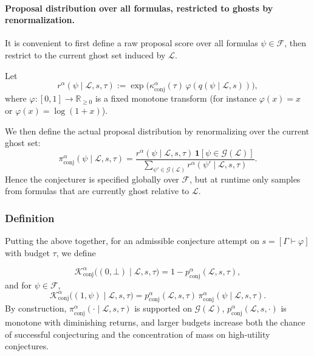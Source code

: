 \documentclass[letterpaper]{article} %
\renewcommand{\phi}{\varphi}
\newcommand{\proves}{\vdash}
\begin{document}
\paragraph{Proposal distribution over all formulas, restricted to ghosts by renormalization.}
It is convenient to first define a raw proposal score over all formulas $\psi\in\mathcal F$, then restrict to the current ghost set induced by $\mathcal L$.

Let
\[
r^\alpha(\psi\mid \mathcal L,s,\tau)
:=
\exp\!\Big(\kappa^\alpha_{\mathrm{conj}}(\tau)\,\varphi(q(\psi\mid \mathcal L,s))\Big),
\]
where $\varphi:[0,1]\to\mathbb R_{\ge0}$ is a fixed monotone transform (for instance $\varphi(x)=x$ or $\varphi(x)=\log(1+x)$).

We then define the actual proposal distribution by renormalizing over the current ghost set:
\[
\pi^\alpha_{\mathrm{conj}}(\psi\mid \mathcal L,s,\tau)
=
\frac{r^\alpha(\psi\mid \mathcal L,s,\tau)\,\mathbf 1[\psi\in\mathcal G(\mathcal L)]}
{\sum_{\psi'\in\mathcal G(\mathcal L)} r^\alpha(\psi'\mid \mathcal L,s,\tau)}.
\]
Hence the conjecturer is specified globally over $\mathcal F$, but at runtime only samples from formulas that are currently ghost relative to $\mathcal L$.

\subsubsection{Definition}

Putting the above together, for an admissible conjecture attempt on $s=[\Gamma\proves\phi]$ with budget $\tau$, we define

\[
\mathcal K^\alpha_{\mathrm{conj}}\big((0,\bot)\mid \mathcal L,s,\tau\big)
=
1-p^\alpha_{\mathrm{conj}}(\mathcal L,s,\tau),
\]
and for $\psi\in\mathcal F$,
\[
\mathcal K^\alpha_{\mathrm{conj}}\big((1,\psi)\mid \mathcal L,s,\tau\big)
=
p^\alpha_{\mathrm{conj}}(\mathcal L,s,\tau)\,\pi^\alpha_{\mathrm{conj}}(\psi\mid \mathcal L,s,\tau).
\]
By construction, $\pi^\alpha_{\mathrm{conj}}(\cdot\mid \mathcal L,s,\tau)$ is supported on $\mathcal G(\mathcal L)$, $p^\alpha_{\mathrm{conj}}(\mathcal L,s,\cdot)$ is monotone with diminishing returns, and larger budgets increase both the chance of successful conjecturing and the concentration of mass on high-utility conjectures.
\end{document}
